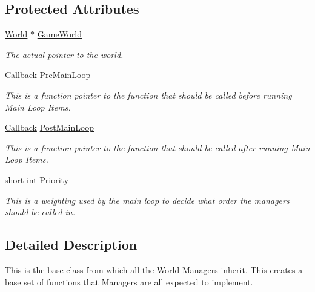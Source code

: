 \subsection*{Protected Attributes}
\begin{DoxyCompactItemize}
\item 
\hyperlink{classphys_1_1World}{World} $\ast$ \hyperlink{classphys_1_1ManagerBase_ae2f158b4b2fef1bf2bee2524e0236c7b}{GameWorld}
\begin{DoxyCompactList}\small\item\em The actual pointer to the world. \item\end{DoxyCompactList}\item 
\hyperlink{classphys_1_1ManagerBase_a753f5f0127131529767beab2502f480b}{Callback} \hyperlink{classphys_1_1ManagerBase_a93eb2f1a30d913a4e99180b0965eb5db}{PreMainLoop}
\begin{DoxyCompactList}\small\item\em This is a function pointer to the function that should be called before running Main Loop Items. \item\end{DoxyCompactList}\item 
\hyperlink{classphys_1_1ManagerBase_a753f5f0127131529767beab2502f480b}{Callback} \hyperlink{classphys_1_1ManagerBase_aa1e80a30f151c07e06d1f4650f315da5}{PostMainLoop}
\begin{DoxyCompactList}\small\item\em This is a function pointer to the function that should be called after running Main Loop Items. \item\end{DoxyCompactList}\item 
short int \hyperlink{classphys_1_1ManagerBase_a28e2690fbcf644a7780a53b81821d8ef}{Priority}
\begin{DoxyCompactList}\small\item\em This is a weighting used by the main loop to decide what order the managers should be called in. \item\end{DoxyCompactList}\end{DoxyCompactItemize}


\subsection{Detailed Description}
This is the base class from which all the \hyperlink{classphys_1_1World}{World} Managers inherit. This creates a base set of functions that Managers are all expected to implement. 

